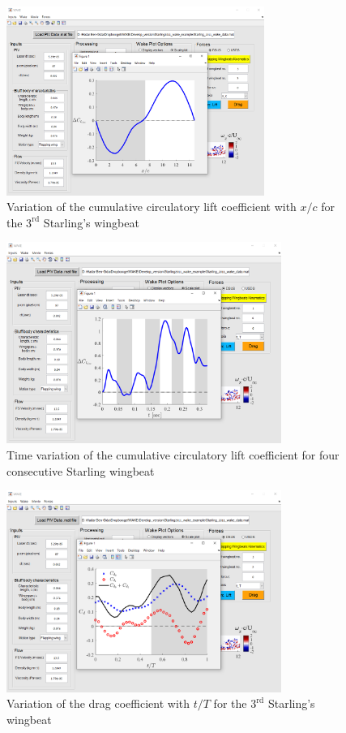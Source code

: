 \documentclass[12pt,a4paper]{article}
\begin{document}
\begin{figure}[ht!]
	\centering
	\includegraphics[width=0.75\textwidth]{dCl-plot-vs-x_c}
	\caption{Variation of the cumulative circulatory lift coefficient with $x/c$ for the $3^\mathrm{rd}$ Starling's wingbeat}
	\label{fig:GUI-dCl-plot-vs-x_c}
\end{figure}

\newpage
\begin{figure}[ht!]
	\centering
	\includegraphics[width=0.8\textwidth]{dCl-plot-vs-time-4-wingbeats}
	\caption{Time variation of the cumulative circulatory lift coefficient for four consecutive Starling wingbeat}
	\label{fig:GUI-dCl-plot-vs-time-4-wingbeats}
\end{figure}

\begin{figure}[ht!]
	\centering
	\includegraphics[width=0.8\textwidth]{drag-plot}
	\caption{Variation of the drag coefficient with $t/T$ for the $3^\mathrm{rd}$ Starling's wingbeat}
	\label{fig:GUI-drag-plot}
\end{figure}
\end{document}
